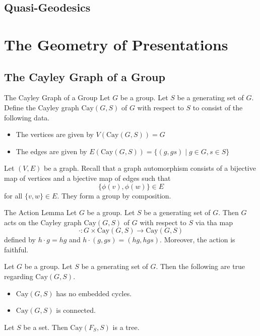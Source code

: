 \documentclass[a4paper]{article}
\begin{document}
\subsection{Quasi-Geodesics}

\pagebreak
\section{The Geometry of Presentations}
\subsection{The Cayley Graph of a Group}
\begin{defn}{The Cayley Graph of a Group}{} Let $G$ be a group. Let $S$ be a generating set of $G$. Define the Cayley graph $\text{Cay}(G,S)$ of $G$ with respect to $S$ to consist of the following data. 
\begin{itemize}
\item The vertices are given by $V(\text{Cay}(G,S))=G$
\item The edges are given by $E(\text{Cay}(G,S))=\{(g,gs)\;|\;g\in G,s\in S\}$
\end{itemize}
\end{defn}

Let $(V,E)$ be a graph. Recall that a graph automorphism consists of a bijective map of vertices and a bjective map of edges such that $$\{\phi(v),\phi(w)\}\in E$$ for all $\{v,w\}\in E$. They form a group by composition. 

\begin{lmm}{The Action Lemma}{} Let $G$ be a group. Let $S$ be a generating set of $G$. Then $G$ acts on the Cayley graph $\text{Cay}(G,S)$ of $G$ with respect to $S$ via tha map $$\cdot:G\times\text{Cay}(G,S)\to\text{Cay}(G,S)$$ defined by $h\cdot g=hg$ and $h\cdot (g,gs)=(hg,hgs)$. Moreover, the action is faithful. 
\end{lmm}

\begin{prp}{}{} Let $G$ be a group. Let $S$ be a generating set of $G$. Then the following are true regarding $\text{Cay}(G,S)$. 
\begin{itemize}
\item $\text{Cay}(G,S)$ has no embedded cycles. 
\item $\text{Cay}(G,S)$ is connected. 
\end{itemize}
\end{prp}

\begin{prp}{}{} Let $S$ be a set. Then $\text{Cay}(F_S,S)$ is a tree. 
\end{prp}
\end{document}
